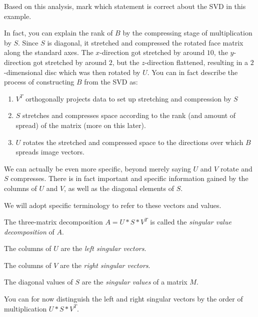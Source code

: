 \documentclass{ximera}
\begin{document}
\begin{problem}

Based on this analysis, mark which statement is correct about the SVD in this example.

\begin{multipleChoice}


\end{multipleChoice}

\begin{feedback}

  In fact, you can explain the rank of $B$ by the compressing stage of multiplication by $S$. Since $S$ is diagonal, it stretched and compressed the rotated face matrix along the standard axes. The $x$-direction got stretched by around $10$, the $y$-direction got stretched by around $2$, but the $z$-direction flattened, resulting in a $2$-dimensional disc which was then rotated by $U$. You can in fact describe the process of constructing $B$ from the SVD as: 

  \begin{enumerate}
    \item $V^T$ orthogonally projects data to set up stretching and compression by $S$
    \item $S$ stretches and compresses space according to the rank (and amount of spread) of the matrix (more on this later).
    \item $U$ rotates the stretched and compressed space to the directions over which $B$ spreads image vectors.
  \end{enumerate}

\end{feedback}

\end{problem}

We can actually be even more specific, beyond merely saying $U$ and $V$ rotate and $S$ compresses. There is in fact important and specific information gained by the columns of $U$ and $V$, as well as the diagonal elements of $S$. 

We will adopt specific terminology to refer to these vectors and values. 

\begin{remark}

  The three-matrix decomposition $A=U*S*V^T$ is called the \emph{singular value decomposition} of $A$.
  
  The columns of $U$ are the \emph{left singular vectors}. 

  The columns of $V$ are the \emph{right singular vectors}. 
  
  The diagonal values of $S$ are the \emph{singular values} of a matrix $M$. 
  
  You can for now distinguish the left and right singular vectors by the order of multiplication $U*S*V^T$.
\end{remark}
\end{document}
